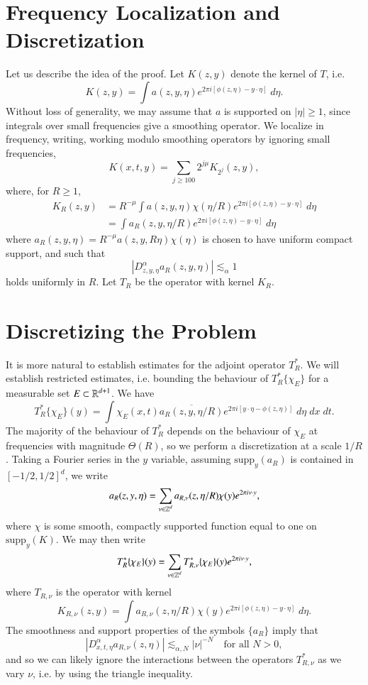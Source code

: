 \section{Frequency Localization and Discretization}

Let us describe the idea of the proof. Let $K(z,y)$ denote the kernel of $T$, i.e.
%
\[ K(z,y) = \int a(z,y,\eta) e^{2 \pi i [\phi(z,\eta) - y \cdot \eta]}\; d\eta. \]
%
Without loss of generality, we may assume that $a$ is supported on $|\eta| \geq 1$, since integrals over small frequencies give a smoothing operator. We localize in frequency, writing, working modulo smoothing operators by ignoring small frequencies,
%
\[ K(x,t,y) = \sum_{j \geq 100} 2^{j \mu} K_{2^j}(z,y), \]
%
where, for $R \geq 1$,
%
\begin{align*}
    K_R(z,y) &= R^{- \mu} \int a(z,y,\eta) \chi(\eta / R) e^{2 \pi i [ \phi(z,\eta) - y \cdot \eta ]}\; d\eta\\
    &= \int a_R(z,y,\eta / R) e^{2 \pi i [ \phi(z,\eta) - y \cdot \eta ]}\; d\eta
\end{align*}
%
where $a_R(z,y,\eta) = R^{-\mu} a(z,y,R \eta) \chi(\eta)$ is chosen to have uniform compact support, and such that
%
\[ |D^\alpha_{z,y,\eta} a_R(z,y,\eta)| \lesssim_\alpha 1 \]
%
holds uniformly in $R$. Let $T_R$ be the operator with kernel $K_R$.

\section{Discretizing the Problem}

It is more natural to establish estimates for the adjoint operator $T_R^*$. We will establish restricted estimates, i.e. bounding the behaviour of $T_R^* \{ \chi_E \}$ for a measurable set $E \subset \operatorname{\mathbb{R}}^{d+1}$. We have
%
\[ T_R^* \{ \chi_E \}(y) = \int \chi_E(x,t) \overline{a_R(z,y,\eta / R)} e^{2 \pi i [ y \cdot \eta - \phi(z,\eta) ]}\; d\eta\; dx\; dt. \]
%
The majority of the behaviour of $T_R^*$ depends on the behaviour of $\chi_E$ at frequencies with magnitude $\Theta(R)$, so we perform a discretization at a scale $1/R$. Taking a Fourier series in the $y$ variable, assuming $\text{supp}_y(a_R)$ is contained in $[-1/2,1/2]^d$, we write
%
\[ a_R(z,y,\eta) = \sum_{\nu \in \operatorname{\mathbb{Z}}^d} a_{R,\nu}(z,\eta / R) \chi(y) e^{2 \pi i \nu \cdot y}, \]
%
where $\chi$ is some smooth, compactly supported function equal to one on $\text{supp}_y(K)$. We may then write
%
\[ T_R^* \{ \chi_E \}(y) = \sum_{\nu \in \operatorname{\mathbb{Z}}^d} T_{R,\nu}^* \{ \chi_E \}(y) e^{2 \pi i \nu \cdot y}, \]
%
where $T_{R,\nu}$ is the operator with kernel 
%
\[ K_{R,\nu}(z,y) = \int a_{R,\nu}(z,\eta / R) \chi(y) e^{2 \pi i [ \phi(z,\eta) - y \cdot \eta ]}\; d\eta. \]
%
The smoothness and support properties of the symbols $\{ a_R \}$ imply that
%
\[ |D^\alpha_{x,t,\eta} a_{R,\nu}(z,\eta)| \lesssim_{\alpha,N} |\nu|^{-N} \quad\text{for all $N > 0$}, \]
%
and so we can likely ignore the interactions between the operators $T_{R,\nu}^*$ as we vary $\nu$, i.e. by using the triangle inequality.


